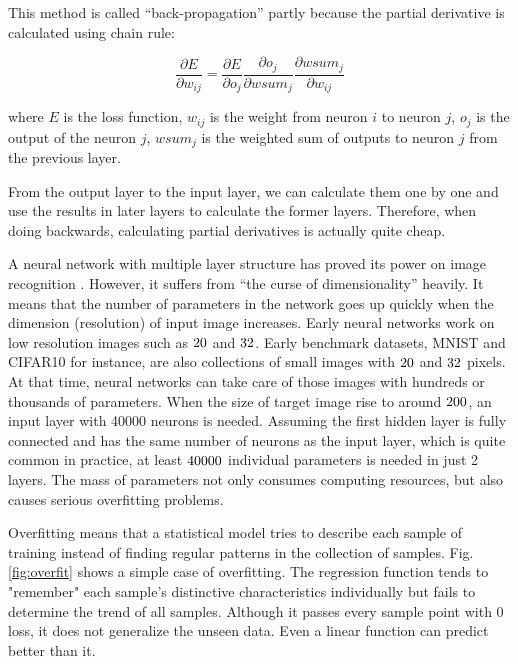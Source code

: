 This method is called \enquote{back-propagation} partly because the partial derivative is calculated using chain rule:

\begin{equation}
\frac{\partial E}{\partial w_{ij}} = \frac{\partial E}{\partial o_j} \frac{\partial o_j}{\partial wsum_j} \frac{\partial wsum_j}{\partial w_{ij}}
\end{equation}

where $E$ is the loss function, $w_{ij}$ is the weight from neuron $i$ to neuron $j$, $o_j$ is the output of the neuron $j$, $wsum_j$ is the weighted sum of outputs to neuron $j$ from the previous layer.

From the output layer to the input layer, we can calculate them one by one and use the results in later layers to calculate the former layers. Therefore, when doing backwards, calculating partial derivatives is actually quite cheap.

A neural network with multiple layer structure has proved its power on image recognition \cite{Rowley1998}. However, it suffers from \enquote{the curse of dimensionality} heavily. It means that the number of parameters in the network goes up quickly when the dimension (resolution) of input image increases. Early neural networks work on low resolution images such as $20 \time 20$ and $32 \time 32$. Early benchmark datasets, MNIST \cite{LeCun1998} and CIFAR10 \cite{Krizhevsky2009} for instance, are also collections of small images with $20 \time 20$ and $32 \time 32$ pixels. At that time, neural networks can take care of those images with hundreds or thousands of parameters. When the size of target image rise to around $200 \time 200$, an input layer with 40000 neurons is needed. Assuming the first hidden layer is fully connected and has the same number of neurons as the input layer, which is quite common in practice, at least $40000 \time 40000$ individual parameters is needed in just 2 layers. The mass of parameters not only consumes computing resources, but also causes serious overfitting problems. 

Overfitting means that a statistical model tries to describe each sample of training instead of finding regular patterns in the collection of samples. Fig.\ref{fig:overfit} shows a simple case of overfitting. The regression function tends to "remember" each sample's distinctive characteristics individually but fails to determine the trend of all samples. Although it passes every sample point with 0 loss, it does not generalize the unseen data. Even a linear function can predict better than it. 

